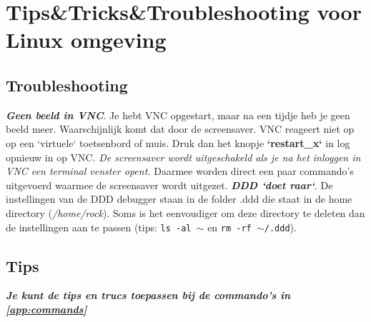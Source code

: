 \hypertarget{LinuxTipsTrics}{}
\chapter{Tips\&Tricks\&Troubleshooting voor Linux omgeving} \label{app:linux}
\section{Troubleshooting}
\textbf{\textit{Geen beeld in VNC}}.\newline 
Je hebt VNC opgestart, maar na een tijdje heb je geen beeld meer.
Waarschijnlijk komt dat door de screensaver. VNC reageert niet op op een `virtuele` toetsenbord of muis. Druk dan het knopje \textbf{`restart\_x`} in log opnieuw in op VNC. 
\textit{De screensaver wordt uitgeschakeld als je na het inloggen in VNC een terminal venster opent.} Daarmee worden direct een paar commando's uitgevoerd waarmee de screensaver wordt uitgezet.\newline
\textbf{\textit{DDD `doet raar`}}.\newline 
De instellingen van de DDD debugger staan in de folder .ddd die staat in de home directory (\textit{/home/rock}). Soms is het eenvoudiger om deze directory te deleten dan de instellingen aan te passen (tips: \texttt{ls -al $\sim$} en \texttt{rm -rf $\sim$/.ddd}).

\section{Tips} \label{app:tips}
\textbf{\textit{Je kunt de tips en trucs toepassen bij de commando's in \ref{app:commands}}}

